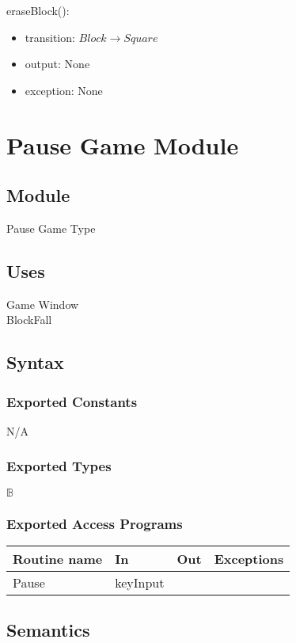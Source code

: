 \documentclass[12pt]{article}
\begin{document}
\noindent eraseBlock():
\begin{itemize}
\item transition: $Block \rightarrow Square$
\item output: None
\item exception: None
\end{itemize}

\newpage

\section* {Pause Game Module}

\subsection*{Module}

Pause Game Type

\subsection* {Uses}

Game Window\\
BlockFall

\subsection* {Syntax}

\subsubsection* {Exported Constants}
N/A
\subsubsection* {Exported Types}

$\mathbb{B}$

\subsubsection* {Exported Access Programs}

\begin{tabular}{| l | l | l | l |}
\hline
\textbf{Routine name} & \textbf{In} & \textbf{Out} & \textbf{Exceptions}\\
\hline
Pause & keyInput &  &  \\
\hline
\end{tabular}

\subsection* {Semantics}
\end{document}
